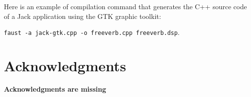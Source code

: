 \documentclass[a4paper]{book}
\begin{document}
\vspace{5 mm}

Here is an example of compilation command that generates the C++ source code of a Jack application using the GTK graphic toolkit:

\texttt{faust -a jack-gtk.cpp -o freeverb.cpp freeverb.dsp}.

\vspace{5 mm}

\chapter{Acknowledgments}
\textbf{Acknowledgments are missing}

\end{document}
